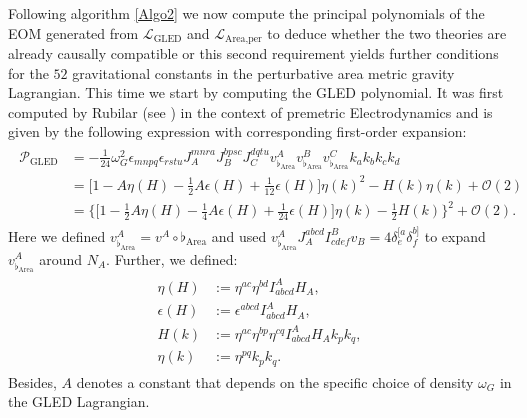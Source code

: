 Following algorithm \ref{Algo2} we now compute the principal polynomials of the EOM generated from $\mathcal{L}_{\text{GLED}}$ and $\mathcal{L}_{\text{Area,per}}$ to deduce whether the two theories are already causally compatible or this second requirement yields further conditions for the $52$ gravitational constants in the perturbative area metric gravity Lagrangian. This time we start by computing the GLED polynomial. It was first computed by Rubilar (see \cite{2009JPhA...42U5402I}) in the context of premetric Electrodynamics and is given by the following expression with corresponding first-order expansion: 
\begin{align} \label{GLEDPoly}
\begin{aligned}
    \mathcal{P}_{\text{GLED}} &= -\frac{1}{24}\omega_G^2\epsilon_{mnpq}\epsilon_{rstu}J_A^{mnra}J_B^{bpsc}J_C^{dqtu} v_{\flat_{\text{Area}}}^A v_{\flat_{\text{Area}}}^B v_{\flat_{\text{Area}}}^C k_ak_bk_ck_d \\
                &= \bigl[ 1 -  A \eta(H)- \frac{1}{2} A \epsilon(H) + \frac{1}{12} \epsilon(H) \bigr] \eta(k)^2 - H(k)\eta(k) + \mathcal{O}(2)\\
                &= \bigl\{  \bigl[ 1 - \frac{1}{2} A \eta(H) - \frac{1}{4} A \epsilon(H) +  \frac{1}{24} \epsilon(H) \bigr] \eta(k) - \frac{1}{2} H(k)       \bigr\}^2 + \mathcal{O}(2).
\end{aligned}
\end{align}
Here we defined $v_{\flat_{\text{Area}}}^A = v^A \circ \flat_{\text{Area}}$ and used $v_{\flat_{\text{Area}}}^A J_A^{abcd} I^B_{cdef}v_B = 4 \delta^{[a}_e \delta^{b]}_f$ to expand $v^A_{\flat_{\text{Area}}}$ around $N_A$. Further, we defined:
\begin{align}
\begin{aligned}
\eta(H) &:= \eta^{ac}\eta^{bd} I^A_{abcd} H_A, \\ 
\epsilon(H) &:=\epsilon^{abcd}I^A_{abcd}H_{A},\\ H(k) &:=\eta^{ac}\eta^{bp}\eta^{cq} I^A_{abcd}H_Ak_pk_q, \\ \eta(k)&:=\eta^{pq}k_pk_q.
\end{aligned}
\end{align}
Besides, $A$ denotes a constant that depends on the specific choice of density $\omega_G$ in the GLED Lagrangian.  

